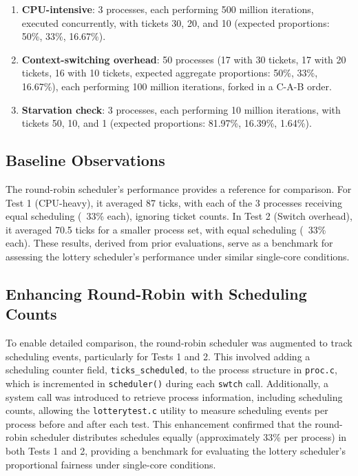 \documentclass{article}
\begin{document}
\begin{enumerate}[label=\arabic*.]
    \item \textbf{CPU-intensive}: 3 processes, each performing 500 million iterations, executed concurrently, with tickets 30, 20, and 10 (expected proportions: 50\%, 33\%, 16.67\%).
    \item \textbf{Context-switching overhead}: 50 processes (17 with 30 tickets, 17 with 20 tickets, 16 with 10 tickets, expected aggregate proportions: 50\%, 33\%, 16.67\%), each performing 100 million iterations, forked in a C-A-B order.
    \item \textbf{Starvation check}: 3 processes, each performing 10 million iterations, with tickets 50, 10, and 1 (expected proportions: 81.97\%, 16.39\%, 1.64\%).
\end{enumerate}

\subsection{Baseline Observations}
The round-robin scheduler’s performance provides a reference for comparison. For Test 1 (CPU-heavy), it averaged 87 ticks, with each of the 3 processes receiving equal scheduling (~33\% each), ignoring ticket counts. In Test 2 (Switch overhead), it averaged 70.5 ticks for a smaller process set, with equal scheduling (~33\% each). These results, derived from prior evaluations, serve as a benchmark for assessing the lottery scheduler’s performance under similar single-core conditions.

\subsection{Enhancing Round-Robin with Scheduling Counts}
To enable detailed comparison, the round-robin scheduler was augmented to track scheduling events, particularly for Tests 1 and 2. This involved adding a scheduling counter field, \texttt{ticks\_scheduled}, to the process structure in \texttt{proc.c}, which is incremented in \texttt{scheduler()} during each \texttt{swtch} call. Additionally, a system call was introduced to retrieve process information, including scheduling counts, allowing the \texttt{lotterytest.c} utility to measure scheduling events per process before and after each test. This enhancement confirmed that the round-robin scheduler distributes schedules equally (approximately 33\% per process) in both Tests 1 and 2, providing a benchmark for evaluating the lottery scheduler’s proportional fairness under single-core conditions.
\end{document}
